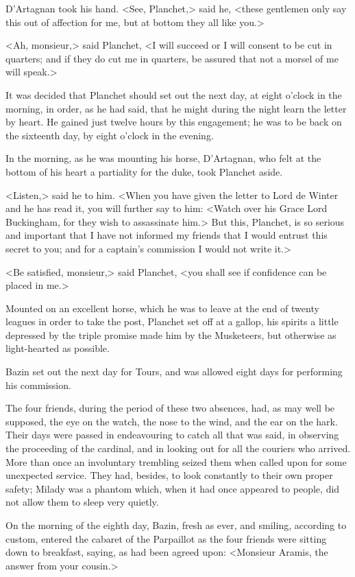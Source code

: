 D'Artagnan took his hand. <See, Planchet,> said he, <these gentlemen only say this out of affection for me, but at bottom they all like you.> 

<Ah, monsieur,> said Planchet, <I will succeed or I will consent to be cut in quarters; and if they do cut me in quarters, be assured that not a morsel of me will speak.> 

It was decided that Planchet should set out the next day, at eight o'clock in the morning, in order, as he had said, that he might during the night learn the letter by heart. He gained just twelve hours by this engagement; he was to be back on the sixteenth day, by eight o'clock in the evening. 

In the morning, as he was mounting his horse, D'Artagnan, who felt at the bottom of his heart a partiality for the duke, took Planchet aside. 

<Listen,> said he to him. <When you have given the letter to Lord de Winter and he has read it, you will further say to him: <Watch over his Grace Lord Buckingham, for they wish to assassinate him.> But this, Planchet, is so serious and important that I have not informed my friends that I would entrust this secret to you; and for a captain's commission I would not write it.>

<Be satisfied, monsieur,> said Planchet, <you shall see if confidence can be placed in me.> 

Mounted on an excellent horse, which he was to leave at the end of twenty leagues in order to take the post, Planchet set off at a gallop, his spirits a little depressed by the triple promise made him by the Musketeers, but otherwise as light-hearted as possible. 

Bazin set out the next day for Tours, and was allowed eight days for performing his commission. 

The four friends, during the period of these two absences, had, as may well be supposed, the eye on the watch, the nose to the wind, and the ear on the hark. Their days were passed in endeavouring to catch all that was said, in observing the proceeding of the cardinal, and in looking out for all the couriers who arrived. More than once an involuntary trembling seized them when called upon for some unexpected service. They had, besides, to look constantly to their own proper safety; Milady was a phantom which, when it had once appeared to people, did not allow them to sleep very quietly. 

On the morning of the eighth day, Bazin, fresh as ever, and smiling, according to custom, entered the cabaret of the Parpaillot as the four friends were sitting down to breakfast, saying, as had been agreed upon: <Monsieur Aramis, the answer from your cousin.> 

